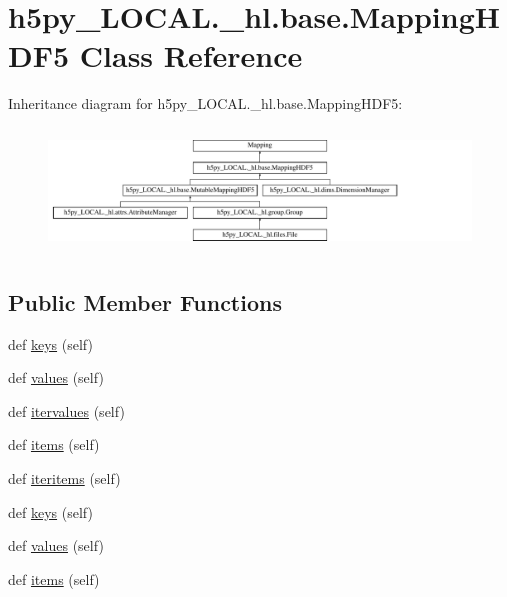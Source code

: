 \hypertarget{classh5py__LOCAL_1_1__hl_1_1base_1_1MappingHDF5}{}\section{h5py\+\_\+\+L\+O\+C\+A\+L.\+\_\+hl.\+base.\+Mapping\+H\+D\+F5 Class Reference}
\label{classh5py__LOCAL_1_1__hl_1_1base_1_1MappingHDF5}
Inheritance diagram for h5py\+\_\+\+L\+O\+C\+A\+L.\+\_\+hl.\+base.\+Mapping\+H\+D\+F5\+:\begin{figure}[H]
\begin{center}
\leavevmode
\includegraphics[height=3.333333cm]{classh5py__LOCAL_1_1__hl_1_1base_1_1MappingHDF5}
\end{center}
\end{figure}
\subsection*{Public Member Functions}
\begin{DoxyCompactItemize}
\item 
def \hyperlink{classh5py__LOCAL_1_1__hl_1_1base_1_1MappingHDF5_a95dd7548a44fe7e84d0a415dc9cd5943}{keys} (self)
\item 
def \hyperlink{classh5py__LOCAL_1_1__hl_1_1base_1_1MappingHDF5_a5c11f8f96e81115ba7d571d116306251}{values} (self)
\item 
def \hyperlink{classh5py__LOCAL_1_1__hl_1_1base_1_1MappingHDF5_a287abf9300e974d17ad12799fc7aacbe}{itervalues} (self)
\item 
def \hyperlink{classh5py__LOCAL_1_1__hl_1_1base_1_1MappingHDF5_a25a3af635780f6ee4b5e532b4cf31a44}{items} (self)
\item 
def \hyperlink{classh5py__LOCAL_1_1__hl_1_1base_1_1MappingHDF5_ae583883d2e3cfafca53ddd69133dac15}{iteritems} (self)
\item 
def \hyperlink{classh5py__LOCAL_1_1__hl_1_1base_1_1MappingHDF5_a95dd7548a44fe7e84d0a415dc9cd5943}{keys} (self)
\item 
def \hyperlink{classh5py__LOCAL_1_1__hl_1_1base_1_1MappingHDF5_a5c11f8f96e81115ba7d571d116306251}{values} (self)
\item 
def \hyperlink{classh5py__LOCAL_1_1__hl_1_1base_1_1MappingHDF5_a25a3af635780f6ee4b5e532b4cf31a44}{items} (self)
\end{DoxyCompactItemize}


